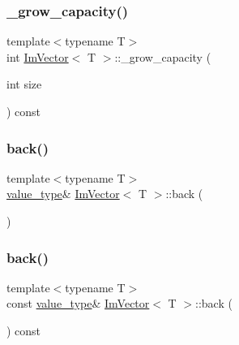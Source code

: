 \subsubsection{\texorpdfstring{\+\_\+grow\+\_\+capacity()}{\_grow\_capacity()}}
{\footnotesize\ttfamily template$<$typename T$>$ \\
int \hyperlink{class_im_vector}{Im\+Vector}$<$ T $>$\+::\+\_\+grow\+\_\+capacity (\begin{DoxyParamCaption}\item[{int}]{size }\end{DoxyParamCaption}) const}

\hypertarget{class_im_vector_a3e4424d3fca190894598a6575f9d2401}{}\label{class_im_vector_a3e4424d3fca190894598a6575f9d2401} 
\subsubsection{\texorpdfstring{back()}{back()}\hspace{0.1cm}{\footnotesize\ttfamily [1/2]}}
{\footnotesize\ttfamily template$<$typename T$>$ \\
\hyperlink{class_im_vector_a8bd77e4e7581d8e5f9e98d7c2f3c2a80}{value\+\_\+type}\& \hyperlink{class_im_vector}{Im\+Vector}$<$ T $>$\+::back (\begin{DoxyParamCaption}{ }\end{DoxyParamCaption})}

\hypertarget{class_im_vector_a6f22918d4f139a1c4c3410ccae726f81}{}\label{class_im_vector_a6f22918d4f139a1c4c3410ccae726f81} 
\subsubsection{\texorpdfstring{back()}{back()}\hspace{0.1cm}{\footnotesize\ttfamily [2/2]}}
{\footnotesize\ttfamily template$<$typename T$>$ \\
const \hyperlink{class_im_vector_a8bd77e4e7581d8e5f9e98d7c2f3c2a80}{value\+\_\+type}\& \hyperlink{class_im_vector}{Im\+Vector}$<$ T $>$\+::back (\begin{DoxyParamCaption}{ }\end{DoxyParamCaption}) const}

\hypertarget{class_im_vector_a300a8b559cd87a78063046ef81151bce}{}\label{class_im_vector_a300a8b559cd87a78063046ef81151bce} 

